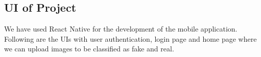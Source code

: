 




\newpage
\subsection{UI of Project}
We have used React Native for the development of the mobile application.
Following are the UIs with user authentication, login page and home page where we can upload images to be classified as fake and real.\\

